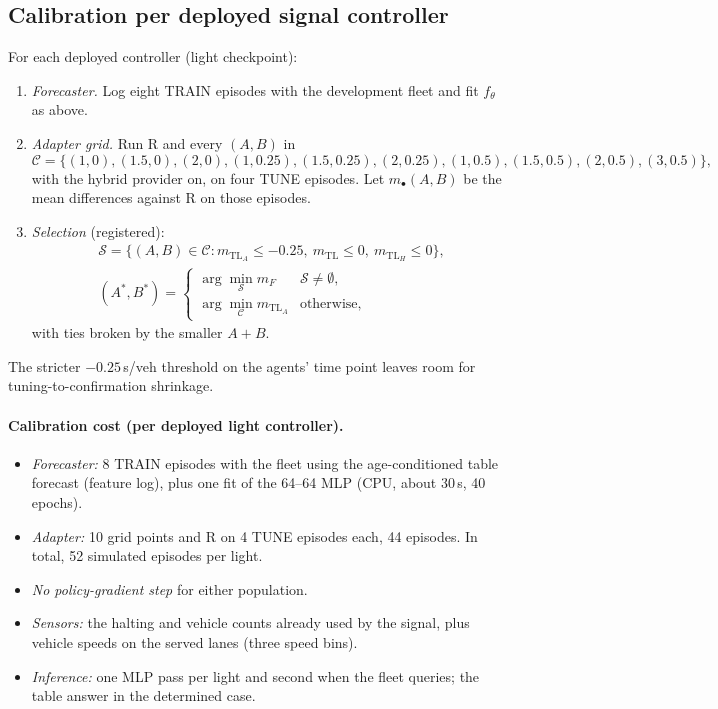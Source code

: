 \documentclass[11pt]{article}
\begin{document}
\subsection{Calibration per deployed signal controller}
For each deployed controller (light checkpoint):
\begin{enumerate}\setlength\itemsep{0pt}
\item \emph{Forecaster.} Log eight TRAIN episodes with the development fleet and fit $f_\theta$ as above.
\item \emph{Adapter grid.} Run R and every $(A,B)$ in
\[\mathcal C=\{(1,0),(1.5,0),(2,0),(1,0.25),(1.5,0.25),(2,0.25),(1,0.5),(1.5,0.5),(2,0.5),(3,0.5)\},\]
with the hybrid provider on, on four TUNE episodes. Let $m_\bullet(A,B)$ be the mean differences against R on those episodes.
\item \emph{Selection} (registered):
\begin{gather}
\mathcal S=\{(A,B)\in\mathcal C: m_{\mathrm{TL}_A}\le-0.25,\ m_{\mathrm{TL}}\le0,\ m_{\mathrm{TL}_H}\le0\},\\
(A^*,B^*)=\begin{cases}\arg\min_{\mathcal S} m_{F} & \mathcal S\neq\emptyset,\\ \arg\min_{\mathcal C} m_{\mathrm{TL}_A} & \text{otherwise,}\end{cases}
\end{gather}
with ties broken by the smaller $A+B$.
\end{enumerate}
The stricter $-0.25$\,s/veh threshold on the agents' time point leaves room for tuning-to-confirmation shrinkage.
\paragraph{Calibration cost (per deployed light controller).}
\begin{itemize}\setlength\itemsep{0pt}
\item \emph{Forecaster:} 8 TRAIN episodes with the fleet using the age-conditioned table forecast (feature log), plus one fit of the
64--64 MLP (CPU, about 30\,s, 40 epochs).
\item \emph{Adapter:} 10 grid points and R on 4 TUNE episodes each, 44 episodes. In total, 52 simulated episodes per light.
\item \emph{No policy-gradient step} for either population.
\item \emph{Sensors:} the halting and vehicle counts already used by the signal, plus vehicle speeds on the served lanes (three speed bins).
\item \emph{Inference:} one MLP pass per light and second when the fleet queries; the table answer in the determined case.
\end{itemize}
\end{document}
